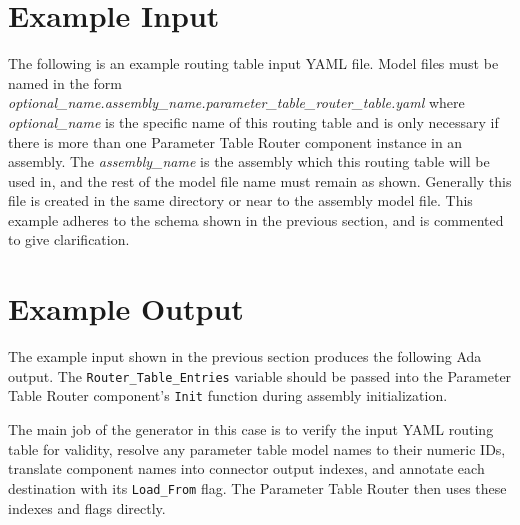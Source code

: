
\section{Example Input}

The following is an example routing table input YAML file. Model files must be named in the form \textit{optional\_name.assembly\_name.parameter\_table\_router\_table.yaml} where \textit{optional\_name} is the specific name of this routing table and is only necessary if there is more than one Parameter Table Router component instance in an assembly. The \textit{assembly\_name} is the assembly which this routing table will be used in, and the rest of the model file name must remain as shown. Generally this file is created in the same directory or near to the assembly model file. This example adheres to the schema shown in the previous section, and is commented to give clarification.


\section{Example Output}

The example input shown in the previous section produces the following Ada output. The \texttt{Router\_Table\_Entries} variable should be passed into the Parameter Table Router component's \texttt{Init} function during assembly initialization.

The main job of the generator in this case is to verify the input YAML routing table for validity, resolve any parameter table model names to their numeric IDs, translate component names into connector output indexes, and annotate each destination with its \texttt{Load\_From} flag. The Parameter Table Router then uses these indexes and flags directly.



